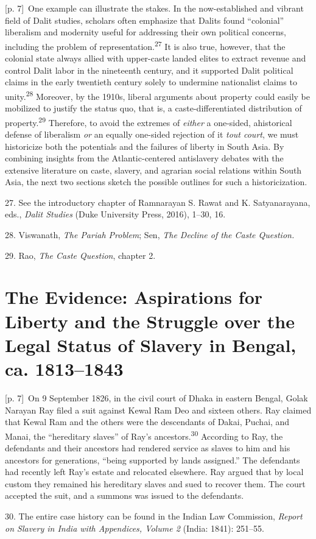 \documentclass[10pt,a4paper]{article}
\begin{document}
{\scriptsize\color{gray} [p. 7]}\ One example can illustrate the stakes. In the now-established and vibrant field of Dalit studies, scholars often emphasize that Dalits found “colonial” liberalism and modernity useful for addressing their own political concerns, including the problem of representation.\nobreak\textsuperscript{27} It is also true, however, that the colonial state always allied with upper-caste landed elites to extract revenue and control Dalit labor in the nineteenth century, and it supported Dalit political claims in the early twentieth century solely to undermine nationalist claims to unity.\nobreak\textsuperscript{28} Moreover, by the 1910s, liberal arguments about property could easily be mobilized to justify the status quo, that is, a caste-differentiated distribution of property.\nobreak\textsuperscript{29} Therefore, to avoid the extremes of \textit{either} a one-sided, ahistorical defense of liberalism \textit{or} an equally one-sided rejection of it \textit{tout court}, we must historicize both the potentials and the failures of liberty in South Asia. By combining insights from the Atlantic-centered antislavery debates with the extensive literature on caste, slavery, and agrarian social relations within South Asia, the next two sections sketch the possible outlines for such a historicization.\par{\small 27. See the introductory chapter of Ramnarayan S. Rawat and K. Satyanarayana, eds., \textit{Dalit Studies} (Duke University Press, 2016), 1–30, 16.\par}{\small 28. Viswanath, \textit{The Pariah Problem}; Sen, \textit{The Decline of the Caste Question.}\par}{\small 29. Rao, \textit{The Caste Question}, chapter 2.\par}
\section*{The Evidence: Aspirations for Liberty and the Struggle over the Legal Status of Slavery in Bengal, ca. 1813–1843}
{\scriptsize\color{gray} [p. 7]}\ On 9 September 1826, in the civil court of Dhaka in eastern Bengal, Golak Narayan Ray filed a suit against Kewal Ram Deo and sixteen others. Ray claimed that Kewal Ram and the others were the descendants of Dakai, Puchai, and Manai, the “hereditary slaves” of Ray’s ancestors.\nobreak\textsuperscript{30} According to Ray, the defendants and their ancestors had rendered service as slaves to him and his ancestors for generations, “being supported by lands assigned.” The defendants had recently left Ray’s estate and relocated elsewhere. Ray argued that by local custom they remained his hereditary slaves and sued to recover them. The court accepted the suit, and a summons was issued to the defendants.\par{\small 30. The entire case history can be found in the Indian Law Commission, \textit{Report on Slavery in India with Appendices, Volume 2} (India: 1841): 251–55.\par}
\end{document}
